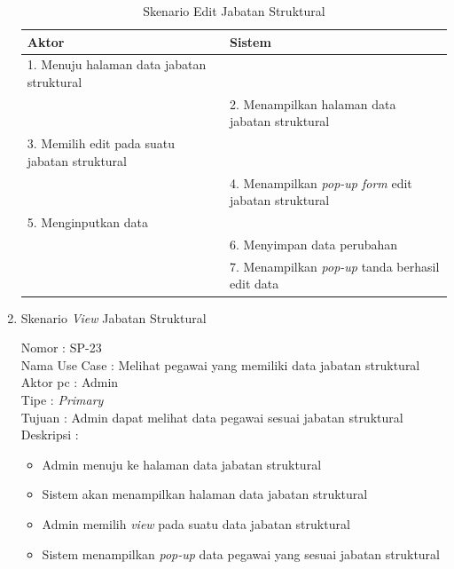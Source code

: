 \begin{enumerate}
\begin{itemize}
\end{itemize}

\begin{table}
	\caption{Skenario Edit Jabatan Struktural}
	\centering
	\begin{tabular}{ |p{75mm} | p{53mm} |}
		\hline 
		\textbf{Aktor} & \textbf{Sistem} \\
		\hline
		
		1.	Menuju halaman data jabatan struktural &  \\
		
		\hline
		
		&  2.	Menampilkan halaman data jabatan struktural \\
		
		\hline
		
		3. Memilih edit pada suatu jabatan struktural & \\
		
		\hline
		
		& 4.	Menampilkan \textit{pop-up form} edit jabatan struktural\\
		
		\hline
		
		5.	Menginputkan data  & \\
		\hline
		
		& 6.	Menyimpan data perubahan \\
		\hline
		
		& 7.	Menampilkan \textit{pop-up} tanda berhasil edit data \\
		\hline
		
	\end{tabular}
\end{table}

\item Skenario \textit{View} Jabatan Struktural

Nomor \kern 3.6pc : SP-23\\
Nama Use Case : Melihat pegawai yang memiliki data jabatan struktural \\
Aktor  pc : Admin \\
Tipe \kern 4.6pc : \textit{Primary} \\
Tujuan \kern 3.6pc : Admin dapat melihat data pegawai sesuai jabatan struktural\\
Deskripsi \kern 2.5pc : 

\begin{itemize}
	\item Admin menuju ke halaman data jabatan struktural
	\item Sistem akan menampilkan halaman data jabatan struktural
	\item Admin memilih \textit{view} pada suatu data jabatan struktural
	\item Sistem menampilkan \textit{pop-up} data pegawai yang sesuai jabatan struktural
	

\end{itemize}
\end{enumerate}

